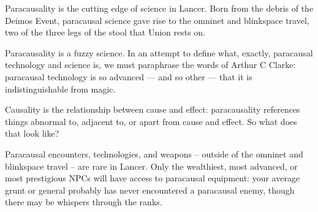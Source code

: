 Paracausality is the cutting edge of science in Lancer. Born from the debris of the Deimos Event,
paracausal science gave rise to the omninet and blinkspace travel, two of the three legs of the
stool that Union rests on.


Paracausality is a fuzzy science. In an attempt to define what, exactly, paracausal technology
and science is, we must paraphrase the words of Arthur C Clarke: paracausal technology is so
advanced — and so other — that it is indistinguishable from magic.


Causality is the relationship between cause and effect: paracausality references things abnormal
to, adjacent to, or apart from cause and effect. So what does that look like?


Paracausal encounters, technologies, and weapons -- outside of the omninet and blinkspace
travel -- are rare in Lancer. Only the wealthiest, most advanced, or most prestigious NPCs will
have access to paracausal equipment: your average grunt or general probably has never
encountered a paracausal enemy, though there may be whispers through the ranks.






